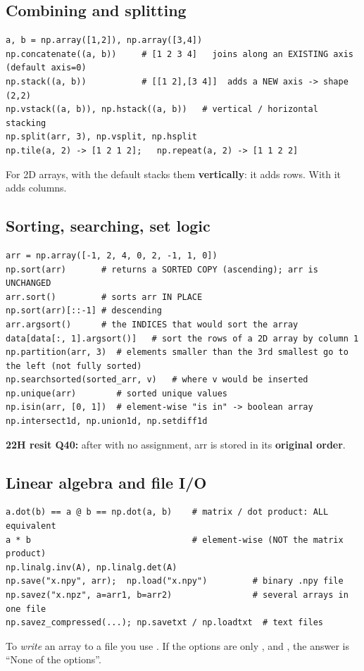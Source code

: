 \subsection{Combining and splitting}
\begin{codebox}
\begin{Verbatim}
a, b = np.array([1,2]), np.array([3,4])
np.concatenate((a, b))     # [1 2 3 4]   joins along an EXISTING axis (default axis=0)
np.stack((a, b))           # [[1 2],[3 4]]  adds a NEW axis -> shape (2,2)
np.vstack((a, b)), np.hstack((a, b))   # vertical / horizontal stacking
np.split(arr, 3), np.vsplit, np.hsplit
np.tile(a, 2) -> [1 2 1 2];   np.repeat(a, 2) -> [1 1 2 2]
\end{Verbatim}
\end{codebox}
For 2D arrays,  with the default  stacks them \textbf{vertically}: it adds rows. With  it adds columns.

\subsection{Sorting, searching, set logic}
\begin{codebox}
\begin{Verbatim}
arr = np.array([-1, 2, 4, 0, 2, -1, 1, 0])
np.sort(arr)       # returns a SORTED COPY (ascending); arr is UNCHANGED
arr.sort()         # sorts arr IN PLACE
np.sort(arr)[::-1] # descending
arr.argsort()      # the INDICES that would sort the array
data[data[:, 1].argsort()]   # sort the rows of a 2D array by column 1
np.partition(arr, 3)  # elements smaller than the 3rd smallest go to the left (not fully sorted)
np.searchsorted(sorted_arr, v)   # where v would be inserted
np.unique(arr)        # sorted unique values
np.isin(arr, [0, 1])  # element-wise "is in" -> boolean array
np.intersect1d, np.union1d, np.setdiff1d
\end{Verbatim}
\end{codebox}
\textbf{22H resit Q40:} after  with no assignment, arr is stored in its \textbf{original order}.

\subsection{Linear algebra and file I/O}
\begin{codebox}
\begin{Verbatim}
a.dot(b) == a @ b == np.dot(a, b)    # matrix / dot product: ALL equivalent
a * b                                # element-wise (NOT the matrix product)
np.linalg.inv(A), np.linalg.det(A)
np.save("x.npy", arr);  np.load("x.npy")         # binary .npy file
np.savez("x.npz", a=arr1, b=arr2)                # several arrays in one file
np.savez_compressed(...); np.savetxt / np.loadtxt  # text files
\end{Verbatim}
\end{codebox}
To \emph{write} an array to a file you use . If the options are only ,  and , the answer is ``None of the options''.


